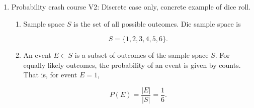 \documentclass{article}
\begin{document}
\begin{enumerate}
\begin{enumerate}
\item The probability mass function $p(x) = P(X=x)$ gives the probability that $X$ has value $x$, allowing for unequally likely outcomes. Note $\sum_x p(x) = 1$. For the dice, $p(x) = \frac{1}{6}$ for all outcomes. 

\item The expected value (mean) of discrete random variable $X$ is
\[
\mathbb{E}[X] = \sum_x x \, p(x),
\]
which represents the long-run average outcome. For the die roll, $\mathbb{E}[X] = 3.5$.


\item The variance of $X$ measures spread around the mean.
\[
\]
where $\mu = \mathbb{E}[X]$ which can be simplified as
\[
\mathrm{Var}(X) = \mathbb{E}[(X - \mu)^2] = \sum_x (x - \mu)^2 \, p(x) = \dots = E(X^2) - [E(X)]^2.
\]
Variance is nice from a math perspective and good for algebraic properties. For our die, $\mathrm{Var}(X) = 2.916667$ (dice value squared).

\item The standard deviation is the square root of variance, an alternate measure of spread.
\[
\sigma = \mathrm{SD}(X) = \sqrt{\mathrm{Var}(X)}.
\]
Standard deviation is messy mathematically, but it is in the same units of $X$. For the continuous case, this represents interpretable spread (68-95-99 rule for a normal distribution). For the die, $\sigma = 1.707825$ meaning 66\% (2-5) lie within one standard deviation.

\item Expected value of a function $g(X)$ is
\[
\mathbb{E}[g(X)] = \sum_x g(x) \, p(x).
\]

\end{enumerate}

\item Probability crash course V2: Discrete case only, concrete example of dice roll.

\begin{enumerate}
\item Sample space $S$ is the set of all possible outcomes. Die sample space is

$$
S=\{1,2,3,4,5,6\}.
$$

\item An event $E \subset S$ is a subset of outcomes of the sample space $S$. For equally likely outcomes, the probability of an event is given by counts. That is, for event $E={1}$,

$$
P(E)=\frac{|E|}{|S|}=\frac{1}{6}.
$$


\end{enumerate}
\end{enumerate}
\end{document}
